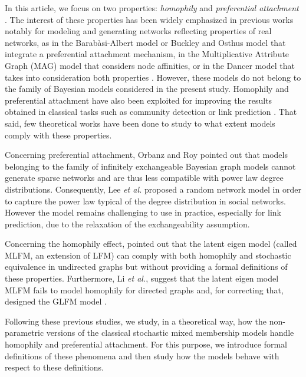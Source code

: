 \documentclass[journal]{IEEEtran}
\begin{document}
In this article, we focus on two properties:  \textit{homophily} and \textit{preferential attachment} \cite{Newman2010, Barabasi2003}. The interest of these properties has been widely emphasized in previous works notably for modeling and generating networks reflecting properties of real networks, as in the Barab\`asi-Albert model \cite{albert2002statistical} or Buckley and Osthus model \cite{Buckley2001} that integrate a preferential attachment mechanism, in the Multiplicative Attribute Graph (MAG) model \cite{Kim2012} that considers node affinities, or in the Dancer model that takes into consideration both properties \cite{Largeron2017}. However, these models do not belong to the family of Bayesian models considered in the present study. Homophily and preferential attachment have also  been exploited for improving the results obtained in classical tasks such as community detection \cite{Ciglan2013,Zhang2016} or link prediction \cite{Aiello2012,Zeng2016}. That said, few theoretical works have been done to study to what extent models comply with these properties.

Concerning preferential attachment, Orbanz and Roy \cite{orbanz2015bayesian} pointed out that models belonging to the family of infinitely exchangeable Bayesian graph models cannot generate sparse networks and are thus less compatible with power law degree distributions. Consequently, Lee \textit{et al.} \cite{Lee2015} proposed a random network model in order to capture the power law typical of the degree distribution in social networks. However the model remains challenging to use in practice, especially for link prediction, due to the relaxation of the exchangeability assumption.

Concerning the homophily effect, \cite{hoff2008modeling} pointed out that the latent eigen model (called MLFM, an extension of LFM) can comply with both homophily and stochastic equivalence in undirected graphs but without providing a formal definitions of these properties. Furthermore, Li \textit{et al.}, suggest that the latent eigen model  MLFM fails to model homophily  for directed graphs and, for correcting that, designed the GLFM model \cite{Li11}.

Following these previous studies, we study, in a theoretical way, how the non-parametric versions of the classical stochastic mixed membership models handle homophily and preferential attachment. For this purpose, we introduce formal definitions of these phenomena and then study how the models behave with respect  to these definitions.
\end{document}
